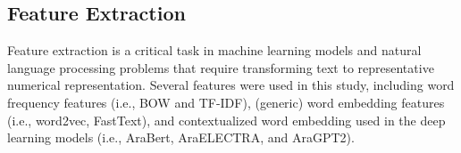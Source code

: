 \documentclass[sn-mathphys,Numbered]{sn-jnl}%
\begin{document}








\subsection{Feature Extraction}
\label{subSec:feature} 
Feature extraction is a critical task in machine learning models and natural language processing problems that require transforming text to representative numerical representation. %
Several features were used in this study, including word frequency features (i.e., BOW and TF-IDF), (generic) word embedding features (i.e., word2vec, FastText), and contextualized word embedding used in the deep learning models (i.e., AraBert, AraELECTRA, and AraGPT2).
\end{document}
